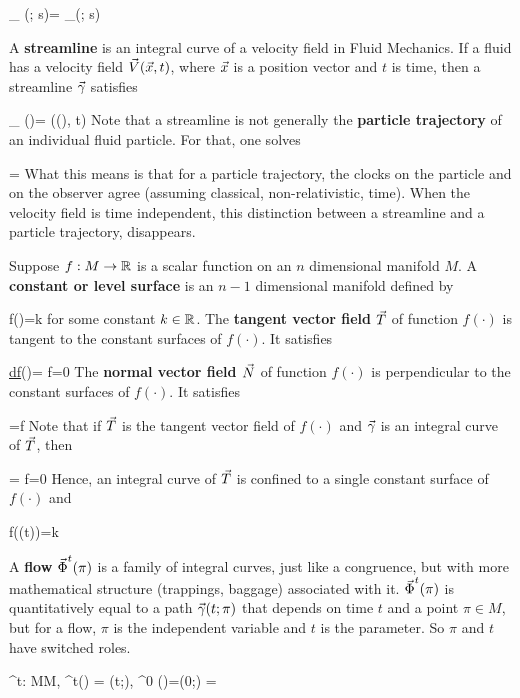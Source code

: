\beq
\partial_\tau 
\vgamma(\tau; s)=
\vecX_{\vgamma(\tau; s)}
\eeq

A {\bf streamline}
is an integral 
curve of a velocity  field in Fluid
Mechanics.
If a fluid has a velocity field
${\vec{V}}({\vec{x}}, t)$, where
${\vec{x}}$ is a 
position vector and
$t$ is time,
then a streamline
${\vec{\gamma}}$ satisfies

\beq
\partial_\tau 
\vgamma(\tau)=
\vecV(\vgamma(\tau), t)
\eeq
Note that a streamline is not generally the {\bf particle trajectory} of an individual fluid particle.
For that, one solves

\beq
{}
=
\eeq
What this means is that
for a particle trajectory,  the clocks 
on the 
particle and on
the observer agree
(assuming classical, non-relativistic, time).
When the 
velocity field
is time independent,
this
distinction between
a streamline
and a particle trajectory, disappears.

Suppose $f:M\rightarrow{ \mathbb{R}}$
is a scalar function
on an $n$ dimensional manifold $M$.
A {\bf constant or level surface} 
is an $n-1$
dimensional manifold defined by

\beq
f(\vecx)=k
\eeq
for some constant $k\in{ \mathbb{R}}$.
The {\bf tangent
vector field}
${\vec{T}}$ of
function $f(\cdot)$ 
is tangent
to the constant 
surfaces of $f(\cdot)$. It satisfies

\beq
\ul{df}(\vecT)=
\vecT\cdot \nabla f=0
\eeq
The {\bf normal vector 
field ${\vec{N}}$} of function $f(\cdot)$
is perpendicular to
the constant surfaces of $f(\cdot)$. It satisfies

\beq
\vecN =\nabla f
\eeq 
Note that if
${\vec{T}}$ is the tangent vector
field of $f(\cdot)$
and ${\vec{\gamma}}$
is an integral curve of ${\vec{T}}$,
then 

\beq
{}=
\dot{\vgamma}\cdot
\nabla f=0
\eeq
Hence, an integral
curve of ${\vec{T}}$ is confined  to
a single constant 
surface of $f(\cdot)$ and

\beq
f(\vgamma(t))=k
\eeq

A {\bf flow}
${\vec{\Phi}}^t(\pi)$
is a family of
integral curves,
just like a congruence,
but with more 
mathematical structure (trappings, baggage)
associated with it.
${\vec{\Phi}}^t(\pi)$ is quantitatively
equal to a path
${\vec{\gamma}}(t; \pi)$
that depends 
on time $t$
and a point
$\pi\in M$, but
for a flow,
$\pi$ is the 
independent variable and 
$t$  is the parameter. So
$\pi$ and $t$
have switched roles.

\beq
\vPhi^t: M\rarrow M, \quad
\vPhi^t(\pi) = \vgamma(t;\pi),
\quad \vPhi^0 (\pi)=\vgamma(0;\pi) =\pi
\eeq

